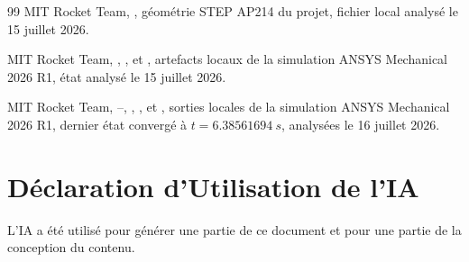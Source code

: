 \documentclass[oneside,openany]{amsdtx}
\begin{document}
\begin{thebibliography}{99}
MIT Rocket Team, , géométrie STEP AP214 du projet, fichier
local analysé le 15 juillet 2026.

MIT Rocket Team, , ,
 et , artefacts locaux de
la simulation ANSYS Mechanical 2026 R1, état analysé le 15 juillet 2026.

MIT Rocket Team, --, ,
,  et
, sorties locales de la simulation ANSYS
Mechanical 2026 R1, dernier état convergé à \(t=\SI{6.38561694}{s}\), analysées
le 16 juillet 2026.

\end{thebibliography}

\clearpage
\listoffigures
\listoftables

\vfill
\section*{Déclaration d'Utilisation de l'IA}

L'IA a été utilisé pour générer une partie de ce document et pour une partie de la conception du contenu.
\end{document}
